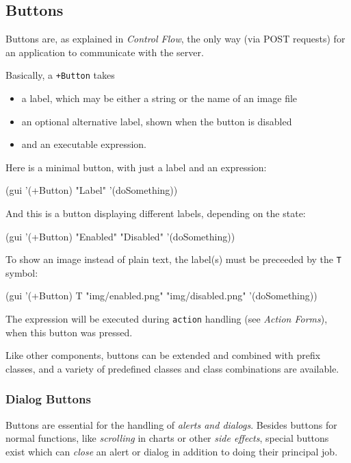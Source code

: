 \subsection{Buttons}
\label{sec:appl-devel-buttons}


Buttons are, as explained in \emph{Control Flow}, the only way
(via POST requests) for an application to communicate with the server.

Basically, a \texttt{+Button} takes

\begin{itemize}
\item a label, which may be either a string or the name of an image file
\item an optional alternative label, shown when the button is disabled
\item and an executable expression.
\end{itemize}

Here is a minimal button, with just a label and an expression:


\begin{wideverbatim}
(gui '(+Button) "Label" '(doSomething))
\end{wideverbatim}

And this is a button displaying different labels, depending on the
state:


\begin{wideverbatim}
(gui '(+Button) "Enabled" "Disabled" '(doSomething))
\end{wideverbatim}

To show an image instead of plain text, the label(s) must be preceeded
by the \texttt{T} symbol:


\begin{wideverbatim}
(gui '(+Button) T "img/enabled.png" "img/disabled.png" '(doSomething))
\end{wideverbatim}

The expression will be executed during \texttt{action} handling (see
\emph{Action Forms}), when this button was pressed.

Like other components, buttons can be extended and combined with prefix
classes, and a variety of predefined classes and class combinations are
available.


\subsubsection{ Dialog Buttons}
\label{sec:appl-devel-dialog-buttons}%

Buttons are essential for the handling of \emph{alerts and dialogs}. Besides buttons for normal functions, like
\emph{scrolling} in charts or other \emph{side effects}, special buttons exist which can \emph{close} an alert or dialog in
addition to doing their principal job.

